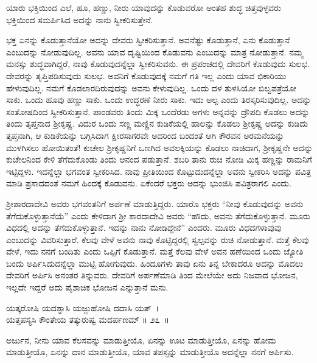 \begin{artha}
ಯಾರು ಭಕ್ತಿಯಿಂದ ಎಲೆ, ಹೂ, ಹಣ್ಣು, ನೀರು ಯಾವುದನ್ನು ಕೊಡುವರೋ ಅಂತಹ ಶುದ್ಧ ಚಿತ್ತವುಳ್ಳವರು ಭಕ್ತಿಯಿಂದ ಸಮರ್ಪಿಸಿದ ಅದನ್ನು ನಾನು ಸ್ವೀಕರಿಸುತ್ತೇನೆ.
\end{artha}

ಭಕ್ತ ಏನನ್ನು ಕೊಡುತ್ತಾನೆಯೋ ಅದನ್ನು ದೇವರು ಸ್ವೀಕರಿಸುತ್ತಾನೆ. ಅವನೆಷ್ಟು ಕೊಡುತ್ತಾನೆ, ಏನು ಕೊಡುತ್ತಾನೆ ಎಂಬುದನ್ನು ನೋಡುವುದಿಲ್ಲ. ಅವನು ಯಾವ ದೃಷ್ಟಿಯಿಂದ ಕೊಡುವನು ಎಂಬುದನ್ನು ಮಾತ್ರ ನೋಡುತ್ತಾನೆ. ನಮ್ಮ ಮನಸ್ಸು ಶುದ್ಧವಾಗಿದ್ದರೆ, ನಾವು ಕೊಡುವುದನ್ನೆಲ್ಲಾ ಸ್ವೀಕರಿಸುವನು. ಈ ಪ್ರಪಂಚದಲ್ಲಿ ದೇವರಿಗೆ ಕೊಡುವುದು ಸುಲಭ. ದೇವರನ್ನು ತೃಪ್ತಿಪಡಿಸುವುದು ಸುಲಭ. ಅವನಿಗೆ ಕೊಡುವುದಕ್ಕೆ ನಮಗೆ ಗತಿ ಇಲ್ಲ ಎಂದು ಯಾವ ಭಿಕಾರಿಯು ಹೇಳುವುದಿಲ್ಲ. ನಮಗೆ ಕೊಡಲಾರದಿರುವುದನ್ನು ಅವನು ಕೇಳುವುದಿಲ್ಲ. ಒಂದು ದಳ ತುಳಸಿಯೋ ಬಿಲ್ವಪತ್ರೆಯೋ ಸಾಕು. ಒಂದು ಹೂವು ಹಣ್ಣು ಸಾಕು. ಒಂದು ಉದ್ಧರಣೆ ನೀರು ಸಾಕು. ಇದು ಅಲ್ಪ ಎಂದು ತಿರಸ್ಕರಿಸುವುದಿಲ್ಲ. ಅದನ್ನು ಸಂತೋಷದಿಂದ ಸ್ವೀಕರಿಸುತ್ತಾನೆ. ಪಾಂಡವರು ತಿಂದು ಮಿಕ್ಕ ಒಂದೆರಡು ಅಗಳು ಅನ್ನವನ್ನು ದ್ರೌಪದಿ ಕೊಡಲು ಅದನ್ನು ತಿಂದು ತೃಪ್ತನಾದ ಶ‍್ರೀಕೃಷ್ಣ. ವಿದುರ ಒಂದು ಸಣ್ಣ ಮಣ್ಣಿನ ಕುಡಿಕೆಯಲ್ಲಿ ಹಾಲನ್ನು ಕೊಡಲು ಶ‍್ರೀಕೃಷ್ಣ ಅದನ್ನು ಕುಡಿದು ತೃಪ್ತನಾಗಿ, ಆ ಕುಡಿಕೆಯನ್ನು ಬಗ್ಗಿಸಿದಾಗ ಕ್ಷೀರಸಾಗರವೇ ಅದರಿಂದ ಬಂದಂತೆ ಆಗಿ ಕೌರವನ ಅರಮನೆಯನ್ನು ಮುಳಗಿಸಲು ಹೋಯಿತಂತೆ! ಕುಚೇಲ ಶ‍್ರೀಕೃಷ್ಣನಿಗೆ ಒಣಗಿದ ಅವಲಕ್ಕಿಯನ್ನು ಕೊಡಲು ನಾಚಿದಾಗ, ಶ‍್ರೀಕೃಷ್ಣನೇ ಅದನ್ನು ಕುಚೇಲನಿಂದ ಕೇಳಿ ತೆಗೆದುಕೊಂಡು ತಿಂದು ಆನಂದ ಪಡುತ್ತಾನೆ. ಶಬರಿ ತಾನು ರುಚಿ ನೋಡಿ ಮಿಕ್ಕ ಹಣ್ಣನ್ನು ರಾಮನಿಗೆ ಇಟ್ಟಿದ್ದಳು. ಇದನ್ನೆಲ್ಲಾ ಭಗವಂತ ಸ್ವೀಕರಿಸಿದ. ನಾವು ಪ್ರೀತಿಯಿಂದ ಕೊಟ್ಟುದುದನ್ನೆಲ್ಲಾ ಅವನು ಸ್ವೀಕರಿಸಿ ಅದನ್ನು ಪವಿತ್ರ ಮಾಡಿ ಪ್ರಸಾದದಂತೆ ನಮಗೆ ಹಿಂದಕ್ಕೆ ಕೊಡುವನು. ಏಕೆಂದರೆ ಭಕ್ತರು ಅದನ್ನು ಭುಂಜಿಸಿ ಪವಿತ್ರರಾಗಲಿ ಎಂದು.

ಶ‍್ರೀಶಾರದಾದೇವಿ ಅವರು ಭಗವಂತನಿಗೆ ಅರ್ಪಣೆ ಮಾಡುತ್ತಿದ್ದರು. ಯಾರೊ ಭಕ್ತರು “ನೀವು ಕೊಡುವುದನ್ನು ಅವನು ತೆಗೆದುಕೊಳ್ಳುತ್ತಾನೆಯೆ” ಎಂದು ಕೇಳಿದಾಗ ಶ‍್ರೀ ಶಾರದಾದೇವಿ ಅವರು “ಹೌದು, ಅವನು ತೆಗೆದುಕೊಳ್ಳುತ್ತಾನೆ. ಮೂರು ವಿಧದಲ್ಲಿ ಅದನ್ನು ತೆಗೆದುಕೊಳ್ಳುತ್ತಾನೆ. ಇದನ್ನು ನಾನು ನೋಡಿದ್ದೇನೆ” ಎಂದರು. ಮೂರು ವಿಧದಗಳಾವುವು ಎಂಬುದನ್ನು ವಿವರಿಸುತ್ತಾರೆ. ಕೆಲವು ವೇಳೆ ಅವನು ನಾವು ಕೊಟ್ಟಿದ್ದರಲ್ಲಿ ಸ್ವಲ್ಪವನ್ನು ರುಚಿ ನೋಡುತ್ತಾನೆ. ಮತ್ತೆ ಕೆಲವು ವೇಳೆ, ಇದು ನನಗೆ ಬಂದಿತು ಎಂದು ಒಪ್ಪಿಗೆ ಕೊಡುತ್ತಾನೆ. ಮತ್ತೆ ಕೆಲವು ವೇಳೆ ಅವನ ಹಣೆಯಿಂದ ಒಂದು ಜ್ಯೋತಿ ಬಂದು ಅರ್ಪಿಸಿದುದನ್ನೆಲ್ಲಾ ಮುಟ್ಟಿ ಹೋಗುವುದು. ಹಿಂದೂಗಳು ತಾವು ಏನು ತಿನ್ನ ಬೇಕಾದರೂ ಅದನ್ನು ಮೊದಲು ದೇವರಿಗೆ ಅರ್ಪಿಸಿ ಅನಂತರ ತಿನ್ನುವರು. ದೇವರಿಗೆ ಅರ್ಪಣೆಮಾಡಿ ತಿಂದ ಮೇಲೆಯೇ ಅದು ನಿಜವಾದ ಭೋಜನ, ಇಲ್ಲದೇ ಇದ್ದರೆ ಅದು ಪೈಶಾಚಿಕ ಭೋಜನ ಎನ್ನುತ್ತಾನೆ ಮನು.

\begin{shloka}
ಯತ್ಕರೋಷಿ ಯದಶ್ನಾಸಿ ಯಜ್ಜುಹೋಷಿ ದದಾಸಿ ಯತ್~।\\ಯತ್ತಪಸ್ಯಸಿ ಕೌಂತೇಯ ತತ್ಕುರುಷ್ವ ಮದರ್ಪಣಮ್ \hfill॥ ೨೭~॥
\end{shloka}

\begin{artha}
ಅರ್ಜುನ, ನೀನು ಯಾವ ಕೆಲಸವನ್ನು ಮಾಡುತ್ತೀಯೊ, ಏನನ್ನು ಊಟ ಮಾಡುತ್ತೀಯೊ, ಏನನ್ನು ಹೋಮ ಮಾಡುತ್ತೀಯೊ, ಏನನ್ನು ದಾನ ಮಾಡುತ್ತೀಯೊ, ಯಾವ ತಪಸ್ಸನ್ನು ಮಾಡುತ್ತೀಯೊ ಅದನ್ನೆಲ್ಲಾ ನನಗೆ ಅರ್ಪಿಸು.
\end{artha}

